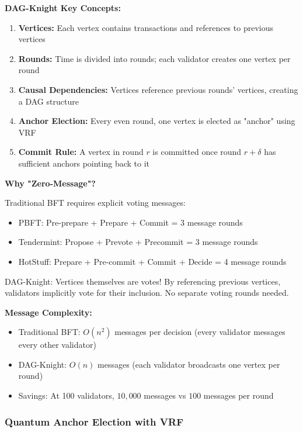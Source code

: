 \documentclass[11pt,a4paper]{article}
\begin{document}
\textbf{DAG-Knight Key Concepts:}

\begin{enumerate}[leftmargin=*]
\item \textbf{Vertices:} Each vertex contains transactions and references to previous vertices

\item \textbf{Rounds:} Time is divided into rounds; each validator creates one vertex per round

\item \textbf{Causal Dependencies:} Vertices reference previous rounds' vertices, creating a DAG structure

\item \textbf{Anchor Election:} Every even round, one vertex is elected as "anchor" using VRF

\item \textbf{Commit Rule:} A vertex in round $r$ is committed once round $r + \delta$ has sufficient anchors pointing back to it
\end{enumerate}

\textbf{Why "Zero-Message"?}

Traditional BFT requires explicit voting messages:
\begin{itemize}[leftmargin=*]
\item PBFT: Pre-prepare + Prepare + Commit = 3 message rounds
\item Tendermint: Propose + Prevote + Precommit = 3 message rounds
\item HotStuff: Prepare + Pre-commit + Commit + Decide = 4 message rounds
\end{itemize}

DAG-Knight: Vertices themselves are votes! By referencing previous vertices, validators implicitly vote for their inclusion. No separate voting rounds needed.

\textbf{Message Complexity:}
\begin{itemize}[leftmargin=*]
\item Traditional BFT: $O(n^2)$ messages per decision (every validator messages every other validator)
\item DAG-Knight: $O(n)$ messages (each validator broadcasts one vertex per round)
\item Savings: At 100 validators, $10,000$ messages vs $100$ messages per round
\end{itemize}

\subsubsection{Quantum Anchor Election with VRF}
\end{document}
